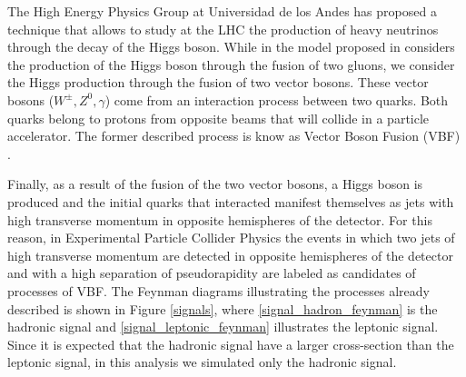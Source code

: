 The High Energy Physics Group at Universidad de los Andes has proposed a technique that allows to study at the LHC the production of heavy neutrinos through the decay of the Higgs boson. While in 
the model proposed in \cite{Seesaw Mechanism with displace vertices} considers the production of the Higgs boson through the fusion of two gluons, we consider the Higgs production through the fusion
of two vector bosons. These vector bosons ($W^{\pm},Z^0,\gamma$) come from an interaction process between two quarks. Both quarks belong to protons from opposite beams that will collide in a 
particle accelerator. The former described process is know as Vector Boson Fusion (VBF) \cite{VBF processes}. 

Finally, as a result of the fusion of the two vector bosons, a Higgs boson is produced and the initial quarks that interacted manifest themselves as jets with high transverse momentum in opposite
hemispheres of the detector. For this reason, in Experimental Particle Collider Physics the events in which two jets of high transverse momentum are detected in opposite hemispheres of the detector 
and with a high separation of pseudorapidity are labeled as candidates of processes of VBF. The Feynman diagrams illustrating the processes already described is shown in Figure \ref{signals},
where \ref{signal_hadron_feynman} is the hadronic signal and \ref{signal_leptonic_feynman} illustrates the leptonic signal. Since it is expected that the hadronic signal have a larger cross-section
than the leptonic signal, in this analysis we simulated only the hadronic signal.


